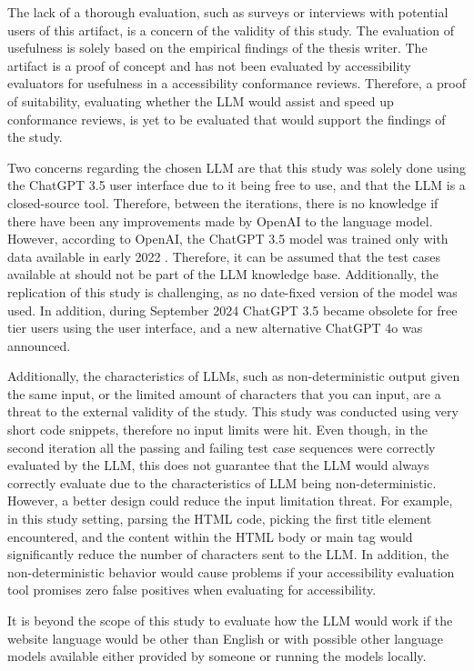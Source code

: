 The lack of a thorough evaluation, such as surveys or interviews with potential users of this artifact, is a concern of the validity of this study. The evaluation of usefulness is solely based on the empirical findings of the thesis writer. The artifact is a proof of concept and has not been evaluated by accessibility evaluators for usefulness in a accessibility conformance reviews. Therefore, a proof of suitability, evaluating whether the LLM would assist and speed up conformance reviews, is yet to be evaluated that would support the findings of the study. 

Two concerns regarding the chosen LLM are that this study was solely done using the ChatGPT 3.5 user interface due to it being free to use, and that the LLM is a closed-source tool. Therefore, between the iterations, there is no knowledge if there have been any improvements made by OpenAI to the language model. However, according to OpenAI, the ChatGPT 3.5 model was trained only with data available in early 2022 \citep{openai_35}. Therefore, it can be assumed that the test cases available at \textcite{act_rule_g88} should not be part of the LLM knowledge base. Additionally, the replication of this study is challenging, as no date-fixed version of the model was used. In addition, during September 2024 ChatGPT 3.5 became obsolete for free tier users using the user interface, and a new alternative ChatGPT 4o was announced.

Additionally, the characteristics of LLMs, such as non-deterministic output given the same input, or the limited amount of characters that you can input, are a threat to the external validity of the study. This study was conducted using very short code snippets, therefore no input limits were hit. Even though, in the second iteration all the passing and failing test case sequences were correctly evaluated by the LLM, this does not guarantee that the LLM would always correctly evaluate due to the characteristics of LLM being non-deterministic. However, a better design could reduce the input limitation threat. For example, in this study setting, parsing the HTML code, picking the first title element encountered, and the content within the HTML body or main tag would significantly reduce the number of characters sent to the LLM. In addition, the non-deterministic behavior would cause problems if your accessibility evaluation tool promises zero false positives when evaluating for accessibility.

It is beyond the scope of this study to evaluate how the LLM would work if the website language would be other than English or with possible other language models available either provided by someone or running the models locally.

